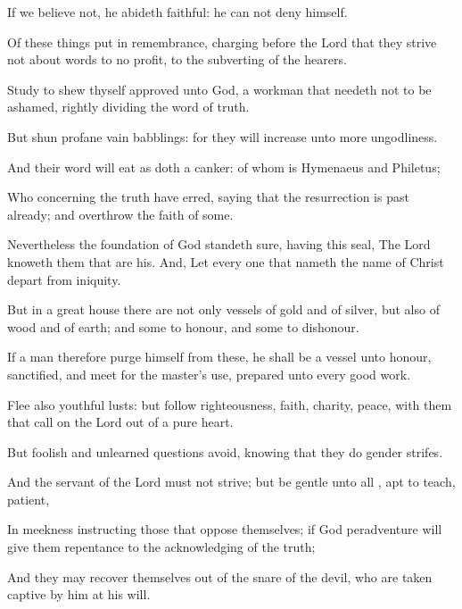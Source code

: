 {If we believe
not,
{}
he
abideth
faithful: he
can
not
deny
himself.

Of these
things
put
{} in
remembrance,
charging
{}
before the
Lord that they
strive
not about
words
to
no
profit,
{}
to the
subverting of the
hearers.

Study to
shew
thyself
approved unto
God, a
workman that needeth not to be
ashamed, rightly
dividing the
word of
truth.

But
shun
profane
{} vain
babblings:
for they will
increase
unto
more
ungodliness.

And
their
word
will
eat as
doth a
canker: of
whom
is
Hymenaeus
and
Philetus;

Who
concerning the
truth have
erred,
saying
that the
resurrection is
past
already;
and
overthrow the
faith of
some.

Nevertheless the
foundation of
God
standeth
sure,
having
this
seal, The
Lord
knoweth them that
are
his.
And,
Let every
one that
nameth the
name of
Christ
depart
from
iniquity.

But
in a
great
house there
are
not
only
vessels of
gold
and of
silver,
but
also of
wood
and of
earth;
and
some
to
honour,
and
some
to
dishonour.

If a
man
therefore
purge
himself
from
these, he shall
be a
vessel
unto
honour,
sanctified,
and meet
for the
master’s
use,
{}
prepared
unto
every
good
work.

Flee
also
youthful
lusts:
but
follow
righteousness,
faith,
charity,
peace,
with them that call
on the
Lord out
of a
pure
heart.

But
foolish
and
unlearned
questions
avoid,
knowing
that they do
gender
strifes.

And the
servant of the
Lord
must
not
strive;
but
be
gentle
unto
all
{}, apt to
teach,
patient,

In
meekness
instructing those that oppose
themselves;
if
God
peradventure will
give
them
repentance
to the
acknowledging of the
truth;

And
{} they may recover
themselves out
of the
snare of the
devil, who are taken
captive
by
him
at
his
will.




\par }
